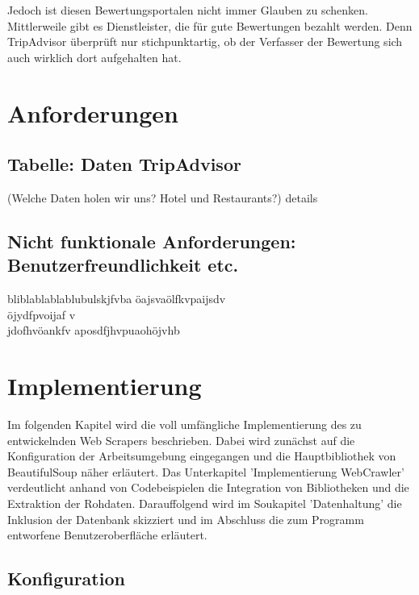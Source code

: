 \documentclass[a4paper,oneside,12pt]{report}
\begin{document}
			Jedoch ist diesen Bewertungsportalen nicht immer Glauben zu schenken. Mittlerweile gibt es Dienstleister, die für gute Bewertungen bezahlt werden. Denn TripAdvisor überprüft nur stichpunktartig, ob der Verfasser der Bewertung sich auch wirklich dort aufgehalten hat. \cite{bib-taSued}
	
	
	\chapter{Anforderungen}	
	
		\section{Tabelle: Daten TripAdvisor}
		
		(Welche Daten holen wir uns? Hotel und Restaurants?) details
	
		\section{Nicht funktionale Anforderungen: Benutzerfreundlichkeit etc.}
	
		bliblablablablubulskjfvba
		öajsvaölfkvpaijsdv
		\\
		öjydfpvoijaf
		v\\jdofhvöankfv
		aposdfjhvpuaohöjvhb
	
	
	
	\chapter{Implementierung}
		
		Im folgenden Kapitel wird die voll umfängliche Implementierung des zu entwickelnden Web Scrapers beschrieben. Dabei wird zunächst auf die Konfiguration der Arbeitsumgebung eingegangen und die Hauptbibliothek von BeautifulSoup näher erläutert. Das Unterkapitel 'Implementierung WebCrawler' verdeutlicht anhand von Codebeispielen die Integration von Bibliotheken und die Extraktion der Rohdaten. Darauffolgend wird im Soukapitel 'Datenhaltung' die Inklusion der Datenbank skizziert und im Abschluss die zum Programm entworfene Benutzeroberfläche erläutert.
	
		\section{Konfiguration}
		
\end{document}
